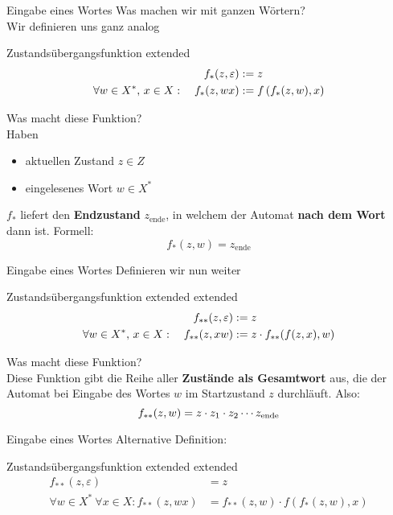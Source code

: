 \begin{frame}{Eingabe eines Wortes}
	Was machen wir mit ganzen Wörtern? \\ \pause
	Wir definieren uns ganz analog
	\begin{block}{Zustandsübergangsfunktion extended}
	\begin{align*}
		 	f_*(z,\varepsilon) &:= z \\
		 	\forall w\in X^* , \, x\in X : \quad  f_*(z,wx) &:= f\left(f_*(z,w),x\right) 
	\end{align*}
	\end{block}
	\pause Was macht diese Funktion? \\ \pause
	\medskip
	Haben
	\begin{itemize}
		\item aktuellen Zustand $z \in Z$
		\item eingelesenes Wort $w \in X^*$
	\end{itemize}
	\impl $f_*$ liefert den \textbf{Endzustand} $z_\text{ende}$, in welchem der Automat \textbf{nach dem Wort} dann ist.
	Formell: $$ f_*(z,w) = z_\text{ende} $$
\end{frame}
	
\begin{frame}{Eingabe eines Wortes}
	Definieren wir nun weiter 
	\begin{block}{Zustandsübergangsfunktion extended extended}
		\begin{align*}
			f_{**}(z, \varepsilon) &:= z \\
			\forall w\in X^* , \, x\in X : \quad  f_{**}(z, xw)   &:= z \cdot f_{**}\!\left(f(z,x),w\right) \\
		\end{align*}
	\end{block}
	\pause Was macht diese Funktion? \\ \pause
	Diese Funktion gibt die Reihe aller \textbf{Zustände als Gesamtwort} aus, die der Automat bei Eingabe des Wortes $w$ im Startzustand $z$ durchläuft. Also: 
	$$ f_{**}(z, w) = z \cdot z_1 \cdot z_2 \cdots z_\text{ende} $$
\end{frame}

\begin{frame}{Eingabe eines Wortes}		
	Alternative Definition:
	\begin{block}{Zustandsübergangsfunktion extended extended}
		\begin{align*}
			f_{**}(z,\varepsilon) &= z \\
			\forall w \in X^* \ \forall x \in X : f_{**}(z,wx) &= f_{**}(z,w)\cdot f(f_*(z,w),x)	 
		\end{align*}
	\end{block}
\end{frame}

